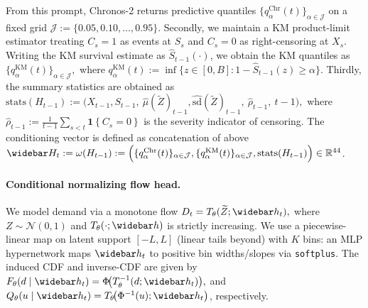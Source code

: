 \documentclass[11pt]{article}
\DeclarePairedDelimiter{\ind}{\mathbf{1}\{}{\}}
\providecommand{\R}{\mathbb{R}}
\providecommand{\ind}[1]{\mathbf{1}\!\left\{#1\right\}}
\providecommand{\cJ}{\mathcal{J}}
\providecommand{\cN}{\mathcal{N}}
\begin{document}
From this prompt, Chronos-2 returns predictive quantiles $\bigl\{q^{\mathrm{Chr}}_{\alpha}(t)\bigr\}_{\alpha\in\cJ}$ on a fixed grid
\(
\cJ := \{0.05,0.10,\dots,0.95\}
\). Secondly, we maintain a KM product-limit estimator treating $C_s=1$ as events at $S_s$ and $C_s=0$ as right-censoring
at $X_s$. Writing the KM survival estimate as $\widehat{S}_{t-1}(\cdot)$, we obtain the KM quantiles as \(
\bigl\{q^{\mathrm{KM}}_{\alpha}(t)\bigr\}_{\alpha\in\cJ},
\)
where $q^{\mathrm{KM}}_{\alpha}(t) := \inf\{z\in[0,B]: 1-\widehat{S}_{t-1}(z)\ge \alpha\}$. Thirdly, the summary statistics are obtained as
\(
\mathrm{stats}(H_{t-1})
:=
\Big(X_{t-1},S_{t-1},\ \widehat{\mu}(\widetilde Z)_{t-1}, \widehat{\mathrm{sd}}(\widetilde Z)_{t-1},\
\widehat{\rho}_{t-1},\ t-1\Big),
\)
where $\widehat{\rho}_{t-1}:=\frac{1}{t-1}\sum_{s<t}\ind{C_s=0}$ is the severity indicator of censoring. The conditioning vector is defined as concatenation of above
\(
\widebar H_t:=\omega(H_{t-1})
:= \Big(\{q^{\mathrm{Chr}}_{\alpha}(t)\}_{\alpha\in\cJ},
        \{q^{\mathrm{KM}}_{\alpha}(t)\}_{\alpha\in\cJ},
        \mathrm{stats}(H_{t-1})\Big)\in\R^{44}
\).
\paragraph{Conditional normalizing flow head.} We model demand via a monotone flow
\(
D_t = T_\theta(\widetilde Z; \widebar h_t),
\)
where $Z\sim\cN(0,1)$ and $T_\theta(\cdot; \widebar h)$ is strictly increasing. We use a piecewise-linear map on latent support
$[-L,L]$ (linear tails beyond) with $K$ bins: an MLP hypernetwork maps $\widebar h_t$ to positive bin widths/slopes via
\texttt{softplus}. The induced CDF and inverse-CDF are given by
\(
F_\theta(d\mid \widebar h_t)=\Phi\!\bigl(T_\theta^{-1}(d;\widebar h_t)\bigr),\) and
\(Q_\theta(u\mid \widebar h_t)=T_\theta\!\bigl(\Phi^{-1}(u);\widebar h_t\bigr)
\), respectively.
\end{document}
